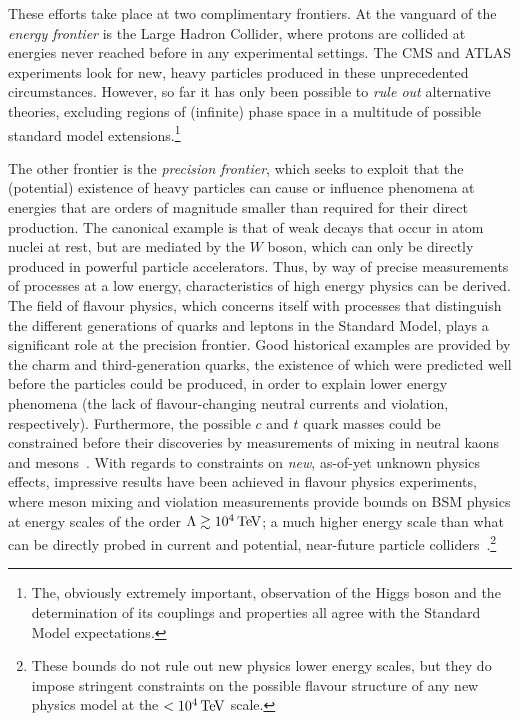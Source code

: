 These efforts take place at two complimentary frontiers. At the vanguard of the \emph{energy frontier} is the Large Hadron Collider, where protons are collided at energies never reached before in any experimental settings. The CMS and ATLAS experiments look for new, heavy particles produced in these unprecedented circumstances. However, so far it has only been possible to \emph{rule out} alternative theories, excluding regions of (infinite) phase space in a multitude of possible standard model extensions.\footnote{The, obviously extremely important, observation of the Higgs boson and the determination of its couplings and properties all agree with the Standard Model expectations.} 

The other frontier is the \emph{precision frontier}, which seeks to exploit that the (potential) existence of heavy particles can cause or influence phenomena at energies that are orders of magnitude smaller than required for their direct production. The canonical example is that of weak decays that occur in atom nuclei at rest, but are mediated by the $W$ boson, which can only be directly produced in powerful particle accelerators. Thus, by way of precise measurements of processes at a low energy, characteristics of high energy physics can be derived. The field of flavour physics, which concerns itself with processes that distinguish the different generations of quarks and leptons in the Standard Model, plays a significant role at the precision frontier. Good historical examples are provided by the charm and third-generation quarks, the existence of which were predicted well before the particles could be produced, in order to explain lower energy phenomena (the lack of flavour-changing neutral currents and \CP violation, respectively). Furthermore, the possible $c$ and $t$ quark masses could be constrained before their discoveries by measurements of mixing in neutral kaons and \B mesons~\cite{2019FPat}. With regards to constraints on \emph{new}, as-of-yet unknown physics effects, impressive results have been achieved in flavour physics experiments, where meson mixing and \CP violation measurements provide bounds on BSM physics at energy scales of the order $\Lambda \gtrsim 10^{4}\text{\,Te\kern -0.1em V}$; a much higher energy scale than what can be directly probed in current and potential, near-future particle colliders~\cite{2019FPat}.\footnote{These bounds do not rule out new physics lower energy scales, but they do impose stringent constraints on the possible flavour structure of any new physics model at the $<10^{4}\text{\,Te\kern -0.1em V}$ scale.}

